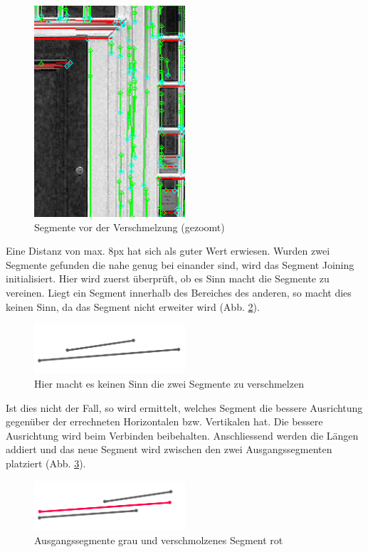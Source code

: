 \begin{figure}[!ht]
\centering
\includegraphics[width=0.5\textwidth]{images/segments-pre-join} 
\caption{Segmente vor der Verschmelzung (gezoomt)}
\label{fig:segments-pre-join}
\end{figure}
\noindent
Eine Distanz von max. 8px hat sich als guter Wert erwiesen. Wurden zwei Segmente gefunden die nahe genug bei einander sind, wird das Segment Joining initialisiert. Hier wird zuerst überprüft, ob es Sinn macht die Segmente zu vereinen. Liegt ein Segment innerhalb des Bereiches des anderen, so macht dies keinen Sinn, da das Segment nicht erweiter wird (Abb. \ref{fig:segment-joining-1}).

\begin{figure}[!ht]
\centering
\includegraphics[width=0.5\textwidth]{images/segment-joining-1} 
\caption{Hier macht es keinen Sinn die zwei Segmente zu verschmelzen}
\label{fig:segment-joining-1}
\end{figure}
\noindent
Ist dies nicht der Fall, so wird ermittelt, welches Segment die bessere Ausrichtung gegenüber der errechneten Horizontalen bzw. Vertikalen hat. Die bessere Ausrichtung wird beim Verbinden beibehalten. Anschliessend werden die Längen addiert und das neue Segment wird zwischen den zwei Ausgangssegmenten platziert (Abb. \ref{fig:segment-joining-2}).

\begin{figure}[!ht]
\centering
\includegraphics[width=0.5\textwidth]{images/segment-joining-2} 
\caption{Ausgangssegmente grau und verschmolzenes Segment rot}
\label{fig:segment-joining-2}
\end{figure}

